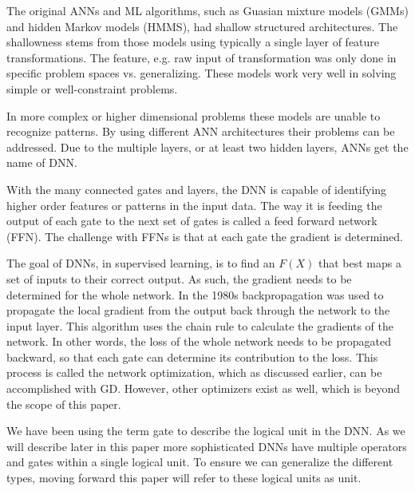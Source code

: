 \documentclass[11pt]{article}
\begin{document}
The original ANNs and ML algorithms, such as Guasian mixture models (GMMs) and hidden Markov models (HMMS), had shallow structured architectures. The shallowness stems from those models using typically a single layer of feature transformations. The feature, e.g. raw input of transformation was only done in specific problem spaces vs. generalizing. These models work very well in solving simple or well-constraint problems.

In more complex or higher dimensional problems these models are unable to recognize patterns. By using different ANN architectures their problems can be addressed. Due to the multiple layers, or at least two hidden layers, ANNs get the name of DNN.

With the many connected gates and layers, the DNN is capable of identifying higher order features or patterns in the input data. The way it is feeding the output of each gate to the next set of gates is called a feed forward network (FFN). The challenge with FFNs is that at each gate the gradient is determined.

The goal of DNNs, in supervised learning, is to find an \(F\left(X\right)\) that best maps a set of inputs to their correct output. As such, the gradient needs to be determined for the whole network. In the 1980s \cite{Rumelhart1985LearningPropagation} backpropagation was used to propagate the local gradient from the output back through the network to the input layer. This algorithm uses the chain rule to calculate the gradients of the network. In other words, the loss of the whole network needs to be propagated backward, so that each gate can determine its contribution to the loss. This process is called the network optimization, which as discussed earlier, can be accomplished with GD. However, other optimizers exist as well, which is beyond the scope of this paper.

We have been using the term gate to describe the logical unit in the DNN. As we will describe later in this paper more sophisticated DNNs have multiple operators and gates within a single logical unit. To ensure we can generalize the different types, moving forward this paper will refer to these logical units as unit.
\end{document}
